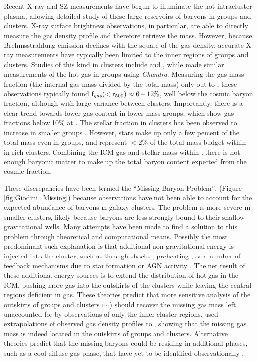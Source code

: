 Recent X-ray and SZ measurements have begun to illuminate the hot
intracluster plasma, allowing detailed study of these large reservoirs
of baryons in groups and clusters. X-ray surface brightness
observations, in particular, are able to directly measure the gas
density profile and therefore retrieve the mass. However, because
Brehmsstrahlung emission declines with the square of the gas density,
accurate X-ray measurements have typically been limited to the inner
regions of groups and clusters. Studies of this kind in clusters
include \citet[][with \textit{Chandra}]{Vikhlinin2006} and
\citet[][with \textit{XMM-Newton}]{Arnaud2007}, while \citet{Sun2009}
made similar measurements of the hot gas in groups using
\textit{Chandra}. Measuring the gas mass fraction (the internal gas
mass divided by the total mass) only out to \rfive{}, these
observations typically found $\textrm{f\ensuremath{_{gas}}}{}(<\textrm{r\ensuremath{_{500}}}{}) \approx 6\;\textrm{--}\;12\%$,
well below the cosmic baryon fraction, although with large variance
between clusters. Importantly, there is a clear trend towards lower
gas content in lower-mass groups, which show gas fractions below
10$\%{}$ at \rfive{}. The stellar fraction in clusters has been
observed to increase in smaller groups \citep{Giodini2009,
  Bahcall2014}. However, stars make up only a few percent of the total
mass even in groups, and represent $<2\%$ of the total mass budget
within \rfive{} in rich clusters. Combining the ICM gas and stellar
mass within \rfive{}, there is not enough baryonic matter to make up
the total baryon content expected from the cosmic fraction.

These discrepancies have been termed the ``Missing Baryon Problem'',
(Figure \ref{fig:Giodini_Missing}) because observations have not been
able to account for the expected abundance of baryons in galaxy
clusters. The problem is more severe in smaller clusters, likely
because baryons are less strongly bound to their shallow gravitational
wells. Many attempts have been made to find a solution to this problem
through theoretical and computational means. Possibly the most
predominant such explanation is that additional non-gravitational
energy is injected into the cluster, such as through shocks
\citep{Takizawa1998}, preheating \citep{Bialek2001}, or a number of
feedback mechanisms due to star formation or AGN activity
\citep{Metzler1994, McCarthy2007, Bode2009}. The net result of these
additional energy sources is to extend the distribution of hot gas in
the ICM, pushing more gas into the outskirts of the clusters while
leaving the central regions deficient in gas. These theories predict
that more sensitive analysis of the outskirts of groups and clusters
($\sim$\rvir{}) should recover the missing gas mass left unaccounted
for by observations of only the inner cluster
regions. \citet{Rasheed2011} used extrapolations of observed gas
density profiles to \rvir{}, showing that the missing gas mass is
indeed located in the outskirts of groups and clusters. Alternative
theories predict that the missing baryons could be residing in
additional phases, such as a cool diffuse gas phase, that have yet to
be identified observationally \citep{Afshordi2007, Bonamente2005}.



